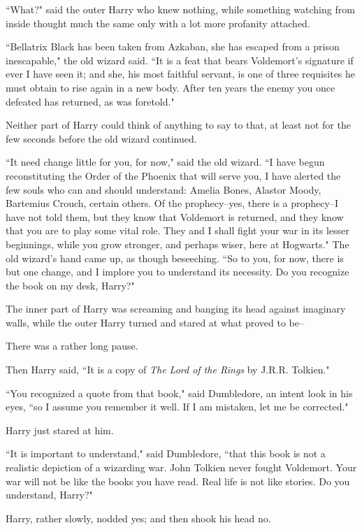 ``What?" said the outer Harry who knew nothing, while something watching from inside thought much the same only with a lot more profanity attached.

``Bellatrix Black has been taken from Azkaban, she has escaped from a prison inescapable," the old wizard said. ``It is a feat that bears Voldemort's signature if ever I have seen it; and she, his most faithful servant, is one of three requisites he must obtain to rise again in a new body. After ten years the enemy you once defeated has returned, as was foretold."

Neither part of Harry could think of anything to say to that, at least not for the few seconds before the old wizard continued.

``It need change little for you, for now," said the old wizard. ``I have begun reconstituting the Order of the Phoenix that will serve you, I have alerted the few souls who can and should understand: Amelia Bones, Alastor Moody, Bartemius Crouch, certain others. Of the prophecy\---yes, there is a prophecy\---I have not told them, but they know that Voldemort is returned, and they know that you are to play some vital role. They and I shall fight your war in its lesser beginnings, while you grow stronger, and perhaps wiser, here at Hogwarts." The old wizard's hand came up, as though beseeching. ``So to you, for now, there is but one change, and I implore you to understand its necessity. Do you recognize the book on my desk, Harry?"

The inner part of Harry was screaming and banging its head against imaginary walls, while the outer Harry turned and stared at what proved to be\---

There was a rather long pause.

Then Harry said, ``It is a copy of \emph{The Lord of the Rings} by J.\?R.\?R. Tolkien."

``You recognized a quote from that book," said Dumbledore, an intent look in his eyes, ``so I assume you remember it well. If I am mistaken, let me be corrected."

Harry just stared at him.

``It is important to understand," said Dumbledore, ``that this book is not a realistic depiction of a wizarding war. John Tolkien never fought Voldemort. Your war will not be like the books you have read. Real life is not like stories. Do you understand, Harry?"

Harry, rather slowly, nodded yes; and then shook his head no.

